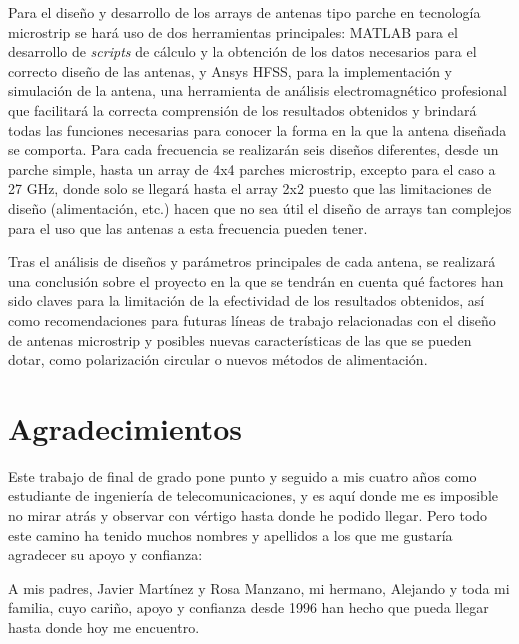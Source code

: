 \par Para el diseño y desarrollo de los arrays de antenas tipo parche en tecnología microstrip se hará uso de dos herramientas principales: MATLAB para el desarrollo de \textit{scripts} de cálculo y la obtención de los datos necesarios para el correcto diseño de las antenas, y Ansys HFSS, para la implementación y simulación de la antena, una herramienta de análisis electromagnético profesional que facilitará la correcta comprensión de los resultados obtenidos y brindará todas las funciones necesarias para conocer la forma en la que la antena diseñada se comporta. Para cada frecuencia se realizarán seis diseños diferentes, desde un parche simple, hasta un array de 4x4 parches microstrip, excepto para el caso a 27 GHz, donde solo se llegará hasta el array 2x2 puesto que las limitaciones de diseño (alimentación, etc.) hacen que no sea útil el diseño de arrays tan complejos para el uso que las antenas a esta frecuencia pueden tener.
\\
\par Tras el análisis de diseños y parámetros principales de cada antena, se realizará una conclusión sobre el proyecto en la que se tendrán en cuenta qué factores han sido claves para la limitación de la efectividad de los resultados obtenidos, así como recomendaciones para futuras líneas de trabajo relacionadas con el diseño de antenas microstrip y posibles nuevas características de las que se pueden dotar, como polarización circular o nuevos métodos de alimentación.





\cleardoublepage %
\chapter*{Agradecimientos}

\thispagestyle{empty}
\vspace{1cm}

\par Este trabajo de final de grado pone punto y seguido a mis cuatro años como estudiante de ingeniería de telecomunicaciones, y es aquí donde me es imposible no mirar atrás y observar con vértigo hasta donde he podido llegar.
Pero todo este camino ha tenido muchos nombres y apellidos a los que me gustaría agradecer su apoyo y confianza:

\par A mis padres, Javier Martínez y Rosa Manzano, mi hermano, Alejando y toda mi familia, cuyo cariño, apoyo y confianza desde 1996 han hecho que pueda llegar hasta donde hoy me encuentro.



